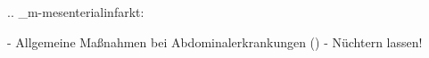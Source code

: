 %

.. _m-mesenterialinfarkt:

\begin{itemize}
  -   Allgemeine Maßnahmen bei Abdominalerkrankungen
  ()
  -   Nüchtern lassen!
\end{itemize}